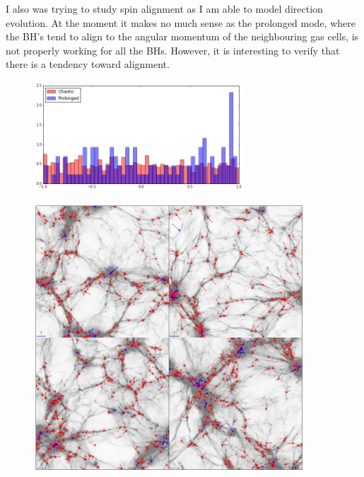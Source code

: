 \documentclass[a4,useAMS,usenatbib,usegraphicx,12pt]{article}
\begin{document}
I also was trying to study spin alignment as I am able to model direction evolution. At the moment it makes no
much sense as the prolonged mode, where the BH's tend to align to the angular momentum of the neighbouring gas
cells, is not properly working for all the BHs. However, it is interesting to verify that there is a tendency
toward alignment.

\begin{figure}[htbp]
\centering
\includegraphics[width=0.7\textwidth]{./figures/Alignment.png}
\end{figure}

\begin{figure}[htbp]
\centering
\includegraphics[width=0.9\textwidth]{./figures/Alignment_Spatial.png}
\end{figure}
\end{document}
